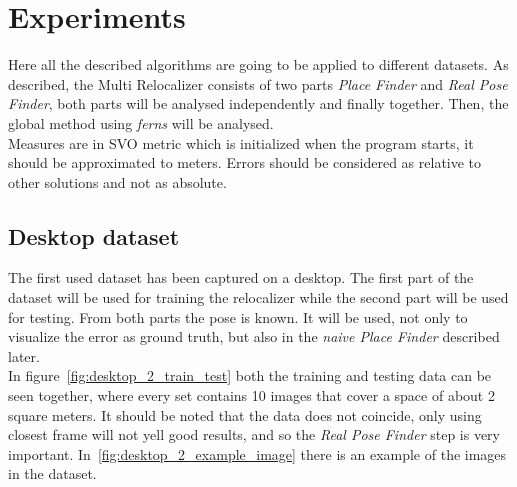 \chapter{Experiments}\label{sec:experiments}

Here all the described algorithms are going to be applied to different datasets. As described, the Multi Relocalizer consists of two parts \textit{Place Finder} and \textit{Real Pose Finder}, both parts will be analysed independently and finally together. Then, the global method using \textit{ferns} will be analysed.\\

Measures are in SVO metric which is initialized when the program starts, it should be approximated to meters. Errors should be considered as relative to other solutions and not as absolute.\\

\section{Desktop dataset}

The first used dataset has been captured on a desktop. The first part of the dataset will be used for training the relocalizer while the second part will be used for testing. From both parts the pose is known. It will be used, not only to visualize the error as ground truth, but also in the \textit{naive Place Finder} described later.\\

In figure~\ref{fig:desktop_2_train_test} both the training and testing data can be seen together, where every set contains 10 images that cover a space of about 2 square meters. It should be noted that the data does not coincide, only using closest frame will not yell good results, and so the \textit{Real Pose Finder} step is very important. In~\ref{fig:desktop_2_example_image} there is an example of the images in the dataset.\\

